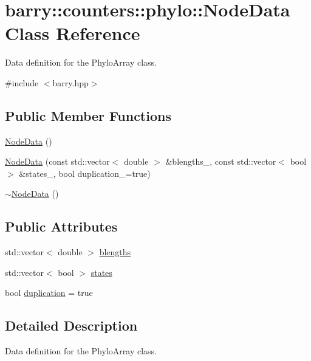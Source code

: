 \hypertarget{classbarry_1_1counters_1_1phylo_1_1_node_data}{}\section{barry\+:\+:counters\+:\+:phylo\+:\+:Node\+Data Class Reference}
\label{classbarry_1_1counters_1_1phylo_1_1_node_data}


Data definition for the {\ttfamily Phylo\+Array} class.  




{\ttfamily \#include $<$barry.\+hpp$>$}

\subsection*{Public Member Functions}
\begin{DoxyCompactItemize}
\item 
\hyperlink{classbarry_1_1counters_1_1phylo_1_1_node_data_ab6c4e49f9964d587e4fba24f9bb41b30}{Node\+Data} ()
\item 
\hyperlink{classbarry_1_1counters_1_1phylo_1_1_node_data_a0559756b8139d402af5046755992d83a}{Node\+Data} (const std\+::vector$<$ double $>$ \&blengths\+\_\+, const std\+::vector$<$ bool $>$ \&states\+\_\+, bool duplication\+\_\+=true)
\item 
\hyperlink{classbarry_1_1counters_1_1phylo_1_1_node_data_a80396a94a947fcb032dc28d3bd66bcdd}{$\sim$\+Node\+Data} ()
\end{DoxyCompactItemize}
\subsection*{Public Attributes}
\begin{DoxyCompactItemize}
\item 
std\+::vector$<$ double $>$ \hyperlink{classbarry_1_1counters_1_1phylo_1_1_node_data_a2ce8909e4774fa283d91ea550c8987b7}{blengths}
\item 
std\+::vector$<$ bool $>$ \hyperlink{classbarry_1_1counters_1_1phylo_1_1_node_data_a9a88332b03b6c78f386a1fafac660052}{states}
\item 
bool \hyperlink{classbarry_1_1counters_1_1phylo_1_1_node_data_a4f45761944f23c8e292750b3ed0569bb}{duplication} = true
\end{DoxyCompactItemize}


\subsection{Detailed Description}
Data definition for the {\ttfamily Phylo\+Array} class. 

